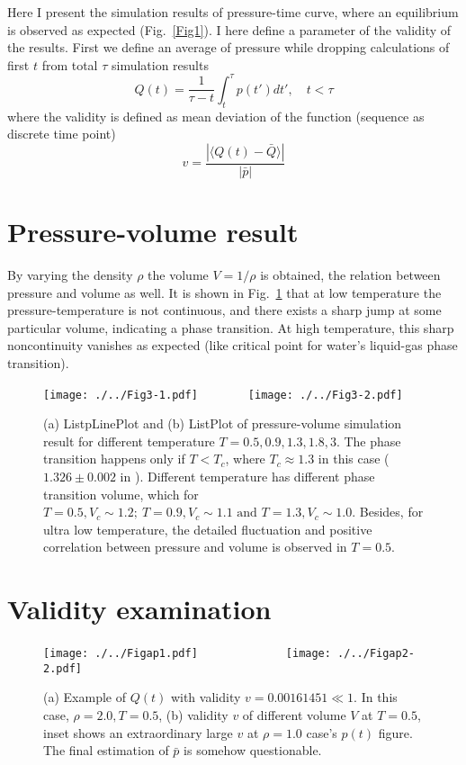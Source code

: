 \documentclass[aps,pra]{revtex4}   	%
\begin{document}
Here I present the simulation results of pressure-time curve, where an equilibrium is observed as expected (Fig.~\ref{Fig1}). I here define a parameter of the validity of the results. First we define an average of pressure while dropping calculations of first $t$ from total $\tau$ simulation results
\[Q(t) = \frac{1}{\tau-t}\int_t^\tau p(t')dt',\quad t<\tau \]
where the validity is defined as mean deviation of the function (sequence as discrete time point)
\[v = \frac{|\langle Q(t)-\bar{Q}\rangle|}{|\bar{p}|} \]

\section{Pressure-volume result}

By varying the density $\rho$ the volume $V=1/\rho$ is obtained, the relation between pressure and volume as well. It is shown in Fig.~\ref{Fig2} that at low temperature the pressure-temperature is not continuous, and there exists a sharp jump at some particular volume, indicating a phase transition. At high temperature, this sharp noncontinuity vanishes as expected (like critical point for water's liquid-gas phase transition). 

\begin{figure}
\begin{center}
\texttt{[image: ./../Fig3-1.pdf]}\ \ \ \ \ \ \ \ 
\texttt{[image: ./../Fig3-2.pdf]}
\end{center}
\caption{(a) ListpLinePlot and (b) ListPlot of pressure-volume simulation result for different temperature $T=0.5, 0.9, 1.3, 1.8, 3$. The phase transition happens only if $T<T_c$, where $T_c\approx 1.3$ in this case ($1.326\pm0.002$ in \cite{caillol1998critical}). Different temperature has different phase transition volume, which for $T=0.5, V_c\sim1.2;\ T=0.9, V_c\sim1.1\text{ and } T=1.3, V_c\sim1.0$. Besides, for ultra low temperature, the detailed fluctuation and positive correlation between pressure and volume is observed in $T=0.5$. }\label{Fig2}
\end{figure}

\appendix
\section{Validity examination}
\begin{figure}[h]
\begin{center}
\texttt{[image: ./../Figap1.pdf]}\ \ \ \ \ \ \ \ \ \ \ \ \ \ 
\texttt{[image: ./../Figap2-2.pdf]}%
\end{center}
\caption{(a) Example of $Q(t)$ with validity $v=0.00161451\ll1$. In this case, $\rho=2.0, T=0.5$, (b) validity $v$ of different volume $V$ at $T=0.5$, %
inset shows an extraordinary large $v$ at $\rho=1.0$ case's $p(t)$ figure. The final estimation of $\bar p$ is somehow questionable. }
\end{figure}
\end{document}
